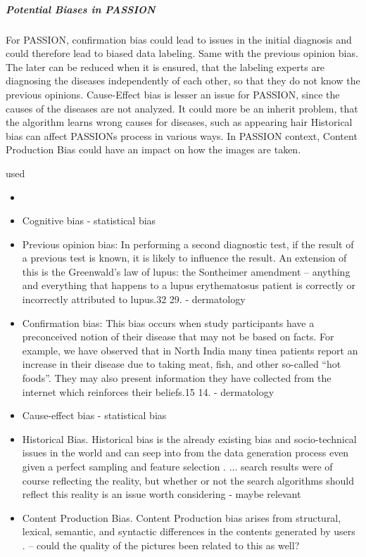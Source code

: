\documentclass[12pt, a4paper, oneside]{book}   	%
\newif\ifrawcitationactive
\newcommand{\rawcitationstart}{
	\color{purple}\rawcitationactivetrue
}
\newcommand{\rawcitationend}{
	\color{black}\rawcitationactivefalse
}
\newcommand{\rawcitationusedstart}{\color{violet}}
\newcommand{\rawcitationusedend}{%
	\ifrawcitationactive
	\color{purple}  %
	\else
	\color{black}  %
	\fi
}
\begin{document}
			\subparagraph{Potential Biases in PASSION}
			For PASSION, confirmation bias could lead to issues in the initial diagnosis and could therefore lead to biased data labeling. Same with the previous opinion bias. The later can be reduced when it is ensured, that the labeling experts are diagnosing the diseases independently of each other, so that they do not know the previous opinions.
			Cause-Effect bias is lesser an issue for PASSION, since the causes of the diseases are not analyzed. It could more be an inherit problem, that the algorithm learns wrong causes for diseases, such as appearing hair
			Historical bias can affect PASSIONs process in various ways.
			In PASSION context, Content Production Bias could have an impact on how the images are taken.
			
			
			\rawcitationstart
			used
			\begin{itemize}		
				\rawcitationusedstart
				\item  	
				\item Cognitive bias \autocites{Mester_2017} - statistical bias
				
				\item  Previous opinion bias: In performing a second diagnostic test, if the result of a previous test is known, it is likely to influence the result. An extension of this is the Greenwald’s law of lupus: the Sontheimer amendment – anything and everything that happens to a lupus erythematosus patient is correctly or incorrectly attributed to lupus.32 29. \autocite{Chakraborty_2024} - dermatology
							
				\item  Confirmation bias: This bias occurs when study participants have a preconceived notion of their disease that may not be based on facts. For example, we have observed that in North India many tinea patients report an increase in their disease due to taking meat, fish, and other so-called “hot foods”. They may also present information they have collected from the internet which reinforces their beliefs.15 14.\autocite{Chakraborty_2024} - dermatology
			
				\item Cause-effect bias \autocites{Mester_2022}{Mester_2017} - statistical bias
			
			
				\item Historical Bias. Historical bias is the already existing bias and socio-technical issues in the world and can seep into from the data generation process even given a perfect sampling and feature selection \autocite{M144_Suresh_2021}. ... search results were of course reflecting the reality, but whether or not the search algorithms should reflect this reality is an issue worth considering \autocite{Mehrabi_2021} - maybe relevant
				
				\item Content Production Bias. Content Production bias arises from structural, lexical, semantic, and syntactic differences in the contents generated by users \autocite{M120_Olteanu_2019}. \autocite{Mehrabi_2021} -- could the quality of the pictures been related to this as well?	
				\rawcitationusedend
			\end{itemize}
			\rawcitationend
			
\end{document}
